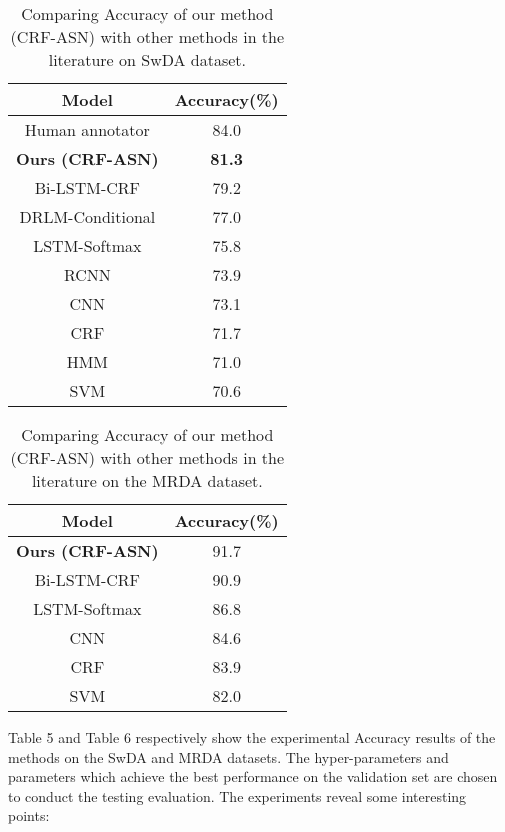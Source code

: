 \documentclass[sigconf]{acmart}
\begin{document}
\begin{table}[t]
	\center
	\small
	\begin{tabular}{| c | c |}
		\hline
		\textbf{Model} 						& \textbf{Accuracy(\%)} 	\\
		\hline
		Human annotator &84.0 \\
		\hline
		\textbf{Ours (CRF-ASN)} &\textbf{81.3}\\
		Bi-LSTM-CRF&79.2  \\
		DRLM-Conditional &77.0 \\
		LSTM-Softmax &75.8 \\
		RCNN &73.9\\
		CNN & 73.1\\
		CRF &71.7\\
		HMM &71.0 \\
		SVM &70.6 \\
		\hline
	\end{tabular}
	\caption{Comparing Accuracy of our method (CRF-ASN) with other methods in the literature on SwDA dataset. }
\end{table}
\begin{table}[t]
	\center
	\small
	\begin{tabular}{| c | c |}
		\hline
		\textbf{Model} & \textbf{Accuracy(\%)} \\
		\hline
		\textbf{Ours (CRF-ASN)} &91.7 \\
		Bi-LSTM-CRF & 90.9 \\
		LSTM-Softmax & 86.8\\
		CNN & 84.6 \\
		CRF & 83.9 \\
		SVM & 82.0 \\
		\hline
	\end{tabular}
	\caption{Comparing Accuracy of our method (CRF-ASN) with other methods in the literature on the MRDA dataset.}
\end{table}
Table 5 and Table 6 respectively show the experimental Accuracy results of the methods on the SwDA and MRDA datasets. The hyper-parameters and parameters which achieve the best performance on the validation set are chosen to conduct the testing evaluation. The experiments reveal some interesting points:
\end{document}
